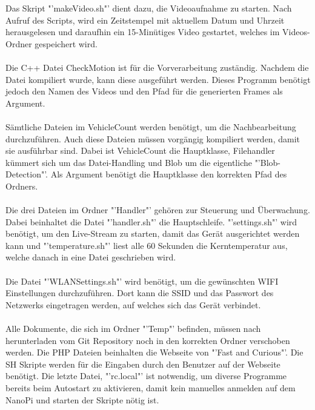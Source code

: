 Das Skript "'makeVideo.sh"' dient dazu, die Videoaufnahme zu starten. Nach Aufruf des Scripts, wird ein Zeitstempel mit aktuellem Datum und Uhrzeit herausgelesen und daraufhin ein 15-Minütiges Video gestartet, welches im Videos-Ordner gespeichert wird.\\\\
Die C++ Datei CheckMotion ist für die Vorverarbeitung zuständig. Nachdem die Datei kompiliert wurde, kann diese ausgeführt werden. Dieses Programm benötigt jedoch den Namen des Videos und den Pfad für die generierten Frames als Argument.\\\\
Sämtliche Dateien im VehicleCount werden benötigt, um die Nachbearbeitung durchzuführen. Auch diese Dateien müssen vorgängig kompiliert werden, damit sie ausführbar sind. Dabei ist VehicleCount die Hauptklasse, Filehandler kümmert sich um das Datei-Handling und Blob um die eigentliche "'Blob-Detection"'. Als Argument benötigt die Hauptklasse den korrekten Pfad des Ordners.\\\\
Die drei Dateien im Ordner "'Handler"' gehören zur Steuerung und Überwachung. Dabei beinhaltet die Datei "'handler.sh"' die Hauptschleife. "'settings.sh"' wird benötigt, um den Live-Stream zu starten, damit das Gerät ausgerichtet werden kann und "'temperature.sh"' liest alle 60 Sekunden die Kerntemperatur aus, welche danach in eine Datei geschrieben wird.\\\\
Die Datei "'WLANSettings.sh"' wird benötigt, um die gewünschten WIFI Einstellungen durchzuführen. Dort kann die SSID und das Passwort des Netzwerks eingetragen werden, auf welches sich das Gerät verbindet.\\\\
Alle Dokumente, die sich im Ordner "'Temp"' befinden, müssen nach herunterladen vom Git Repository noch in den korrekten Ordner verschoben werden. Die PHP Dateien beinhalten die Webseite von "'Fast and Curious"'. Die SH Skripte werden für die Eingaben durch den Benutzer auf der Webseite benötigt. Die letzte Datei, "'rc.local"' ist notwendig, um diverse Programme bereits beim Autostart zu aktivieren, damit kein manuelles anmelden auf dem NanoPi und starten der Skripte nötig ist.\\\\

